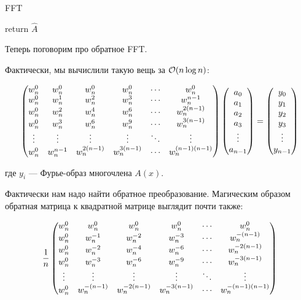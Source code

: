 \begin{algorithm}
  \caption{FFT}
  \begin{algorithmic}[1]
     
    \EndIf
       
    \EndFor
    \State return $\hat A$
    \EndFunction
  \end{algorithmic}
\end{algorithm}

Теперь поговорим про обратное FFT.

Фактически, мы вычислили такую вещь за $\mathcal{O}(n\log n)$:


\[
  \begin{pmatrix}
    w_n^0 & w_n^0 & w_n^0 & w_n^0 & \cdots & w_n^0 \cr 
    w_n^0 & w_n^1 & w_n^2 & w_n^3 & \cdots & w_n^{n-1} \cr 
    w_n^0 & w_n^2 & w_n^4 & w_n^6 & \cdots & w_n^{2(n-1)} \cr 
    w_n^0 & w_n^3 & w_n^6 & w_n^9 & \cdots & w_n^{3(n-1)} \cr 
    \vdots & \vdots & \vdots & \vdots & \ddots & \vdots \cr 
    w_n^0 & w_n^{n-1} & w_n^{2(n-1)} & w_n^{3(n-1)} & \cdots & w_n^{(n-1)(n-1)}
  \end{pmatrix}
  \begin{pmatrix}
     a_0 \cr 
     a_1 \cr 
     a_2 \cr 
     a_3 \cr 
     \vdots \cr 
     a_{n-1}
  \end{pmatrix}
   =
  \begin{pmatrix}
     y_0 \cr 
     y_1 \cr 
     y_2 \cr 
     y_3 \cr 
     \vdots \cr 
     y_{n-1}
  \end{pmatrix}
\]

где $y_i$ --- Фурье-образ многочлена $A(x)$.

Фактически нам надо найти обратное преобразование. Магическим образом обратная
матрица к квадратной матрице выглядит почти также:

\[
  \frac{1}{n}
  \begin{pmatrix}
    w_n^0 & w_n^0 & w_n^0 & w_n^0 & \cdots & w_n^0 \cr 
    w_n^0 & w_n^{-1} & w_n^{-2} & w_n^{-3} & \cdots & w_n^{-(n-1)} \cr 
    w_n^0 & w_n^{-2} & w_n^{-4} & w_n^{-6} & \cdots & w_n^{-2(n-1)} \cr 
    w_n^0 & w_n^{-3} & w_n^{-6} & w_n^{-9} & \cdots & w_n^{-3(n-1)} \cr 
    \vdots & \vdots & \vdots & \vdots & \ddots & \vdots \cr 
    w_n^0 & w_n^{-(n-1)} & w_n^{-2(n-1)} & w_n^{-3(n-1)} & \cdots & w_n^{-(n-1)(n-1)}
  \end{pmatrix}
\]


